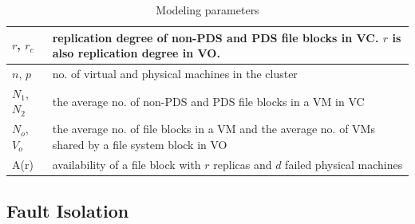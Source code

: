 \begin{table}[t]
\centering
\tabcolsep=0.11cm
\begin{tabular}{|p{1.0cm}|p{5.75cm}|}
\hline
$r$, $r_c$ & replication degree of non-PDS and PDS file blocks in VC. $r$ is also replication degree in VO.\\
\hline
$n$, $p$ & no. of virtual and physical machines in the cluster\\
\hline
$N_1$, $N_2$ & the average no.  of non-PDS and PDS file blocks in a VM in VC\\
\hline
$N_o$, $V_o$ & the average no.  of file blocks  in a VM and the average no. of VMs shared by a file system block in VO\\
\hline
A(r) & availability of a file block with $r$ replicas and $d$ failed physical machines\\
\hline
\end{tabular}
\caption{Modeling  parameters}
\label{tab:symbol}
\end{table}



\subsection{Fault Isolation}
 

